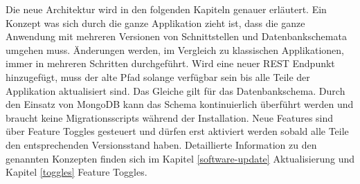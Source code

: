Die neue Architektur wird in den folgenden Kapiteln genauer erläutert. Ein Konzept was sich durch die ganze Applikation zieht ist, dass die ganze Anwendung mit mehreren Versionen von Schnittstellen und Datenbankschemata umgehen muss. Änderungen werden, im Vergleich zu klassischen Applikationen, immer in mehreren Schritten durchgeführt. Wird eine neuer REST Endpunkt hinzugefügt, muss der alte Pfad solange verfügbar sein bis alle Teile der Applikation aktualisiert sind. Das Gleiche gilt für das Datenbankschema. Durch den Einsatz von MongoDB kann das Schema kontinuierlich überführt werden und braucht keine Migrationsscripts während der Installation. Neue Features sind über Feature Toggles gesteuert und dürfen erst aktiviert werden sobald alle Teile den entsprechenden Versionsstand haben. Detaillierte Information zu den genannten Konzepten finden sich im Kapitel \ref{software-update} Aktualisierung und Kapitel \ref{toggles} Feature Toggles.
\newpage
